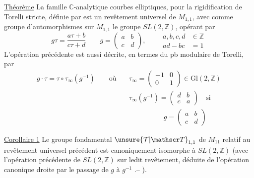 \uline{Théorème} La famille $\mathbb C$-analytique  courbes elliptiques,  pour la rigidification de Torelli stricte, définie par
est un revêtement universel de $M_{1,1}$, avec  comme groupe d'automorphismes sur $M_{1,1}$ le groupe $SL(2,\mathbb Z)$, opérant par
\[
g\tau=\frac{a\tau+b}{c\tau+d}\qquad g=\begin{pmatrix}a&b\\c&d\end{pmatrix},\qquad\begin{aligned}a,b,c,d&\in\mathbb Z\\ad-bc&=1\end{aligned}
\]
L'opération précédente est aussi décrite, en termes du pb modulaire de Torelli, par
\[
\begin{aligned}
g\cdot\tau=\tau\circ\tau_\infty(g^{-1})\qquad \text{où}\quad
&\tau_\infty=\begin{pmatrix}-1&0\\0&1\end{pmatrix}\in\mathrm{Gl}(2,\mathbb Z)\\
&\tau_\infty(g^{-1})=\begin{pmatrix}d&b\\c&a\end{pmatrix}\quad \text{si}\\
&\hspace{5em}g=\begin{pmatrix}a&b\\c&d\end{pmatrix}
\end{aligned}
\]

\uline{Corollaire 1} Le groupe fondamental $\unsure{\mathcal T|\mathscr T}_{1,1}$ de $M_{11}$ relatif au revêtement universel précédent est canoniquement isomorphe à $SL(2,\mathbb Z)$ (avec l'opération précédente  de $SL(2,\mathbb Z)$ sur ledit revêtement, déduite de l'opération canonique  droite par le passage de $g$ à $g^{-1}$ .-- ).

